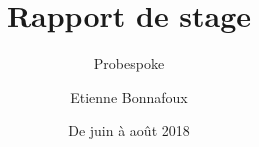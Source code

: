 \documentclass[12pt]{article}
\title{Rapport de stage}
\subtitle{Probespoke}
\author{Etienne Bonnafoux}
\date{De juin à août 2018}
\begin{document}
\maketitle
\newpage
\strut
\newpage
\clearpage


\clearpage

\clearpage
\tableofcontents
\clearpage

\clearpage

\clearpage

\clearpage

\clearpage

\clearpage

\clearpage

\clearpage


\clearpage
\appendix

\end{document}
